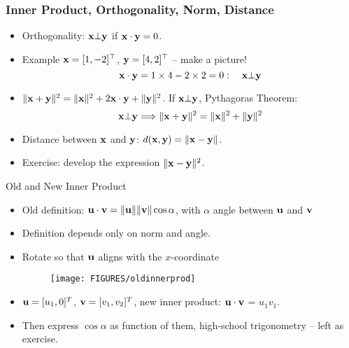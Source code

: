 \documentclass[8pt,dvipsnames]{beamer}
\begin{document}
\begin{frame}
  \frametitle{Inner Product, Orthogonality, Norm, Distance}
  \begin{itemize}[<+->]
  \item Orthogonality: ${\bf x}\bot{\bf y}$ if ${\bf x}\cdot{\bf y} = 0$.
    \vfill
  \item Example ${\bf x} = [1, -2]^\top$, ${\bf y} = [4, 2]^\top$ -- make a picture!
    $$
    {\bf x}\cdot{\bf y} = 1\times 4 - 2\times 2 = 0:\quad {\bf x}\bot {\bf y} 
    $$
    \vfill
  \item $\|{\bf x} + {\bf y}\|^2 = \|{\bf x}\|^2 + 2{\bf x}\cdot{\bf y} + \|{\bf y}\|^2$. If ${\bf x}\bot{\bf y}$, Pythagoras Theorem:
    $$
    {\bf x}\bot{\bf y}\Longrightarrow \|{\bf x} + {\bf y}\|^2 = \|{\bf x}\|^2  + \|{\bf y}\|^2
    $$
    \vfill
  \item Distance between ${\bf x}$ and ${\bf y}$: $d({\bf x},{\bf y}) = \|{\bf x} - {\bf y}\|$.
    \vfill
    \item Exercise: develop the expression $\|{\bf x}-{\bf y}\|^2$.
   \end{itemize}
\end{frame}


\begin{frame}{Old and New Inner Product}
	\begin{itemize}
		\item Old definition: ${\bf u}\cdot {\bf v} = \|{\bf u}\|\|{\bf v}\|\cos\alpha$, with $\alpha$ angle between ${\bf u}$ and ${\bf v}$
		\item Definition depends only on norm and angle.
		\item Rotate so that ${\bf u}$ aligns with the $x$-coordinate
		\begin{figure}
			\centering
			\texttt{[image: FIGURES/oldinnerprod]}
		\end{figure}
	\item ${\bf u} = [u_1,0]^T$, ${\bf v} = [v_1,v_2]^T$, new inner product: ${\bf u}\cdot {\bf v}$ = $u_1 v_1$.
	\item Then express $\cos\alpha$ as function of them, high-school trigonometry -- left as exercise.
	\end{itemize}
\end{frame}
\end{document}
